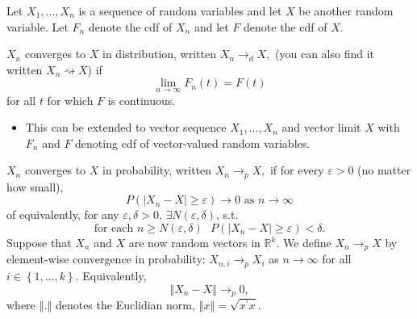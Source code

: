 \documentclass[notes=show]{beamer}
\begin{document}
\begin{frame}%


Let $X_{1},...,X_{n}$ is a sequence of random variables and let $X$ be
another random variable. Let $F_{n}$ denote the cdf of $X_{n}$ and let $F$
denote the cdf of $X$.

\begin{definition}
$X_{n}$ converges to $X$ in distribution, written $X_{n}\rightarrow _{d}X,$
(you can also find it written $X_{n}\rightsquigarrow X$) if%
\begin{equation*}
\lim_{n\rightarrow \infty }F_{n}(t)=F(t)
\end{equation*}%
for all $t$ for which $F$ is continuous.
\end{definition}

\begin{itemize}
\item This can be extended to vector sequence $X_{1},...,X_{n}$ and vector
limit $X$ with $F_{n}$ and $F$ denoting cdf of vector-valued random
variables.
\end{itemize}

\end{frame}%

\begin{frame}%

\begin{definition}
$X_{n}$ converges to $X$ in probability, written $X_{n}\rightarrow _{p}X,$
if for every $\varepsilon >0$ (no matter how small),%
\begin{equation*}
P(|X_{n}-X|\geq \varepsilon )\rightarrow 0\text{ as }n\rightarrow \infty
\end{equation*}%
of equivalently, for any $\varepsilon ,\delta >0$, $\exists N(\varepsilon
,\delta )$, s.t. 
\begin{equation*}
\text{for each }n\geq N(\varepsilon ,\delta )\text{ \ \ \ \ }P(\left\vert
X_{n}-X\right\vert \geq \varepsilon )<\delta .
\end{equation*}%
Suppose that $X_{n}$ and $X$ are now random vectors in $\mathbb{R}^{k}.$ We
define $X_{n}\rightarrow _{p}X$ by element-wise convergence in probability: $%
X_{n,i}\rightarrow _{p}X_{i}$ as $n\rightarrow \infty $ for all $i\in
\left\{ 1,...,k\right\} .$ Equivalently, 
\begin{equation*}
\left\Vert X_{n}-X\right\Vert \rightarrow _{p}0,
\end{equation*}%
where $\left\Vert .\right\Vert $ denotes the Euclidian norm, $\left\Vert
x\right\Vert =\sqrt{x^{\prime }x}.$
\end{definition}

\end{frame}%
\end{document}
